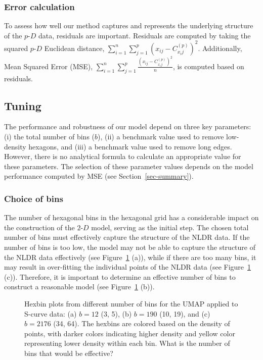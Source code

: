 \documentclass[
  12pt]{article}
\newcommand\pD{$p\text{-}D$}
\newcommand\gD{$2\text{-}D$}
\begin{document}
\subsubsection{Error calculation}\label{error-calculation}

To assess how well our method captures and represents the underlying
structure of the \pD{} data, residuals are important. Residuals are
computed by taking the squared \pD{} Euclidean distance,
\(\sum_{i = 1}^{n}\sum_{j = 1}^{p} (x_{ij} - C^{(p)}_{x_ij})^2\).
Additionally, Mean Squared Error (MSE),
\(\sum_{i = 1}^{n}\sum_{j = 1}^{p} \frac{(x_{ij} - C^{(p)}_{x_ij})^2}{n}\),
is computed based on residuals.

\subsection{Tuning}\label{tuning}

The performance and robustness of our model depend on three key
parameters: (i) the total number of bins (\(b\)), (ii) a benchmark value
used to remove low-density hexagons, and (iii) a benchmark value used to
remove long edges. However, there is no analytical formula to calculate
an appropriate value for these parameters. The selection of these
parameter values depends on the model performance computed by MSE (see
Section~\ref{sec-summary}).

\subsubsection{Choice of bins}\label{choice-of-bins}

The number of hexagonal bins in the hexagonal grid has a considerable
impact on the construction of the \gD{} model, serving as the initial
step. The chosen total number of bins must effectively capture the
structure of the NLDR data. If the number of bins is too low, the model
may not be able to capture the structure of the NLDR data effectively
(see Figure~\ref{fig-bins-scurve} (a)), while if there are too many
bins, it may result in over-fitting the individual points of the NLDR
data (see Figure~\ref{fig-bins-scurve} (c)). Therefore, it is important
to determine an effective number of bins to construct a reasonable model
(see Figure~\ref{fig-bins-scurve} (b)).

\begin{figure}[H]


\caption{\label{fig-bins-scurve}Hexbin plots from different number of
bins for the UMAP applied to S-curve data: (a) \(b = 12\) (3, 5), (b)
\(b = 190\) (10, 19), and (c) \(b = 2176\) (34, 64). The hexbins are
colored based on the density of points, with darker colors indicating
higher density and yellow color representing lower density within each
bin. What is the number of bins that would be effective?}

\end{figure}%
\end{document}
